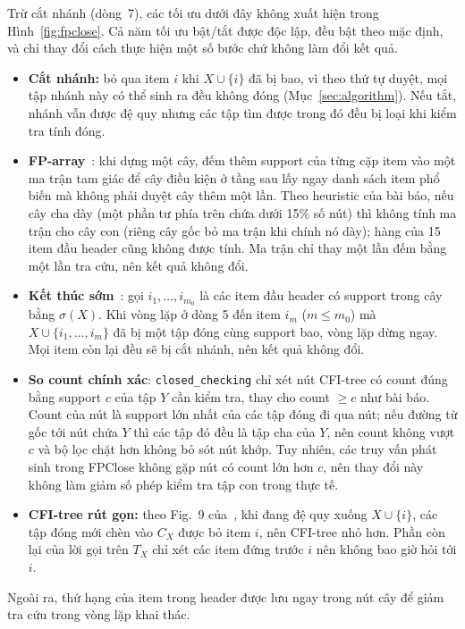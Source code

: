 Trừ cắt nhánh (dòng~7), các tối ưu dưới đây không xuất hiện trong Hình~\ref{fig:fpclose}. Cả năm tối ưu bật/tắt được
độc lập, đều bật theo mặc định, và chỉ thay đổi cách thực hiện một số bước chứ không làm đổi kết quả.
\begin{itemize}
  \item \textbf{Cắt nhánh:} bỏ qua item $i$ khi $X \cup \{i\}$ đã bị bao, vì theo thứ tự duyệt, mọi tập nhánh này có
  thể sinh ra đều không đóng (Mục~\ref{sec:algorithm}). Nếu tắt, nhánh vẫn được đệ quy nhưng các tập tìm được trong đó
  đều bị loại khi kiểm tra tính đóng.
  \item \textbf{FP-array}~\cite{grahne2005}: khi dựng một cây, đếm thêm support của từng cặp item vào một
ma trận tam giác để cây điều kiện ở tầng sau lấy ngay danh sách item phổ biến mà không phải duyệt cây
thêm một lần. Theo heuristic của bài báo, nếu cây cha dày (một phần tư phía trên chứa dưới 15\% số nút)
thì không tính ma trận cho cây con (riêng cây gốc bỏ ma trận khi chính nó dày); hàng của 15 item đầu
header cũng không được tính. Ma trận chỉ thay một lần đếm bằng một lần tra cứu, nên kết quả không đổi.

\item \textbf{Kết thúc sớm}~\cite{grahne2005}: gọi $i_1,\dots,i_{m_0}$ là các item đầu header có support
trong cây bằng $\sigma(X)$. Khi vòng lặp ở dòng 5 đến item $i_m$ ($m \le m_0$) mà
$X \cup \{i_1,\dots,i_m\}$ đã bị một tập đóng cùng support bao, vòng lặp dừng ngay. Mọi item còn lại
đều sẽ bị cắt nhánh, nên kết quả không đổi.

\item \textbf{So count chính xác}: \texttt{closed\_checking} chỉ xét nút CFI-tree có count đúng bằng
support $c$ của tập $Y$ cần kiểm tra, thay cho count $\ge c$ như bài báo. Count của nút là support lớn
nhất của các tập đóng đi qua nút; nếu đường từ gốc tới nút chứa $Y$ thì các tập đó đều là tập cha của
$Y$, nên count không vượt $c$ và bộ lọc chặt hơn không bỏ sót nút khớp. Tuy nhiên, các truy vấn phát
sinh trong FPClose không gặp nút có count lớn hơn $c$, nên thay đổi này không làm giảm số phép kiểm tra
tập con trong thực tế.
  \item \textbf{CFI-tree rút gọn:} theo Fig.~9 của~\cite{grahne2005}, khi đang đệ quy xuống $X \cup \{i\}$, các tập
  đóng mới chèn vào $C_X$ được bỏ item $i$, nên CFI-tree nhỏ hơn. Phần còn lại của lời gọi trên $T_X$ chỉ xét các item
  đứng trước $i$ nên không bao giờ hỏi tới $i$.
\end{itemize}
Ngoài ra, thứ hạng của item trong header được lưu ngay trong nút cây để giảm tra cứu trong vòng lặp khai thác.


